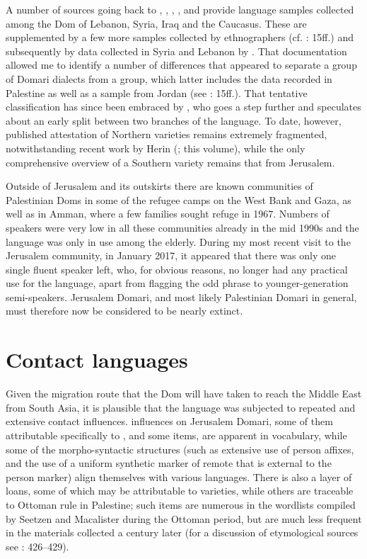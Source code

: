 \documentclass[output=paper]{langsci/langscibook}
\begin{document}
A number of sources going back to \citet{Pott1846}, \citet{Newbold1856}, \citet{Paspati1870}, \citet{Patkanoff1907}, and \citet{Black1913} provide language samples collected among the Dom of Lebanon, Syria, Iraq and the Caucasus. These are supplemented by a few more samples collected by ethnographers (cf. \citealt{Matras2012}: 15ff.) and subsequently by data collected in Syria and Lebanon by \citet{Herin2012}. That documentation allowed me to identify a number of differences that appeared to separate a  group of Domari dialects from a  group, which latter includes the data recorded in Palestine as well as a sample from Jordan (see \citealt{Matras2012}: 15ff.). That tentative classification has since been embraced by \citet{Herin2014Domari}, who goes a step further and speculates about an early split between two branches of the language. To date, however, published attestation of {Northern} varieties remains extremely fragmented, notwithstanding recent work by Herin (\citeyear{Herin2016}; this volume), while the only comprehensive overview of a {Southern} variety remains that from Jerusalem.

Outside of Jerusalem and its outskirts there are known communities of {Palestinian} Doms in some of the refugee camps on the West Bank and Gaza, as well as in Amman, where a few families sought refuge in 1967. Numbers of speakers were very low in all these communities already in the mid 1990s and the language was only in use among the elderly. During my most recent visit to the Jerusalem community, in  January 2017, it appeared that there was only one single fluent speaker left, who, for obvious reasons, no longer had any practical use for the language, apart from flagging the odd phrase to younger-generation semi-speakers. Jerusalem Domari, and most likely Palestinian Domari in general, must therefore now be considered to be nearly extinct.

\section{Contact languages}\label{sec2}

Given the migration route that the Dom will have taken to reach the Middle East from South Asia, it is plausible that the language was subjected to repeated and extensive contact influences.  influences on Jerusalem Domari, some of them attributable specifically to  , and some  items, are apparent in vocabulary, while some of the morpho-syntactic structures (such as extensive use of person affixes, and the use of a uniform synthetic marker of remote  that is external to the person marker) align themselves with various  languages. There is also a layer of  loans, some of which may be attributable to  varieties, while others are traceable to Ottoman rule in Palestine; such items are numerous in the wordlists compiled by Seetzen and Macalister during the Ottoman period, but are much less frequent in the materials collected a century later (for a discussion of etymological sources see \citealt{Matras2012}: 426–429).
\end{document}
